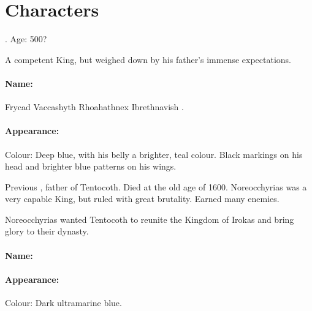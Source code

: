 \section{Characters}



\DragonKing{}. Age: 500? 

A competent King, but weighed down by his father's immense expectations. 

\paragraph{Name:}
Frycad Vaccashyth Rhoahathnex Ibrethnavish . 

\paragraph{Appearance:}
Colour: Deep blue, with his belly a brighter, teal colour. Black markings on his head and brighter blue patterns on his wings. 



Previous \DragonKing{}, father of Tentocoth. Died at the old age of 1600. Noreocchyrias was a very capable King, but ruled with great brutality. Earned many enemies. 

Noreocchyrias wanted Tentocoth to reunite the Kingdom of Irokas and bring glory to their dynasty. 

\paragraph{Name:}

\paragraph{Appearance:}
Colour: Dark ultramarine blue. 



